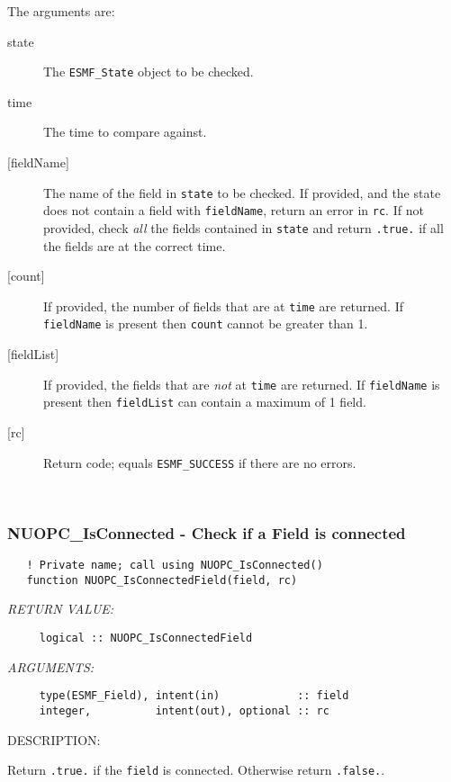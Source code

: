      The arguments are:
     \begin{description}
     \item[state]
       The {\tt ESMF\_State} object to be checked.
     \item[time]
       The time to compare against.
     \item[{[fieldName]}]
       The name of the field in {\tt state} to be checked. If provided, and 
       the state does not contain a field with {\tt fieldName}, return an 
       error in {\tt rc}. If not provided, check {\em all} the fields contained
       in {\tt state} and return {\tt .true.} if all the fields are at the 
       correct time.
     \item[{[count]}]
       If provided, the number of fields that are at {\tt time} are returned. If 
       {\tt fieldName} is present then {\tt count} cannot be greater than 1.
     \item[{[fieldList]}]
       If provided, the fields that are {\em not} at {\tt time} are returned. If 
       {\tt fieldName} is present then {\tt fieldList} can contain a maximum of
       1 field.
     \item[{[rc]}]
       Return code; equals {\tt ESMF\_SUCCESS} if there are no errors.
     \end{description}
   
 
\mbox{}\hrulefill\ 
 
\subsubsection [NUOPC\_IsConnected] {NUOPC\_IsConnected - Check if a Field is connected}


\begin{verbatim}   ! Private name; call using NUOPC_IsConnected()
   function NUOPC_IsConnectedField(field, rc)\end{verbatim}{\em RETURN VALUE:}
\begin{verbatim}     logical :: NUOPC_IsConnectedField\end{verbatim}{\em ARGUMENTS:}
\begin{verbatim}     type(ESMF_Field), intent(in)            :: field
     integer,          intent(out), optional :: rc\end{verbatim}
{\sf DESCRIPTION:\\ }


     Return {\tt .true.} if the {\tt field} is connected.
     Otherwise return {\tt .false.}.
  
